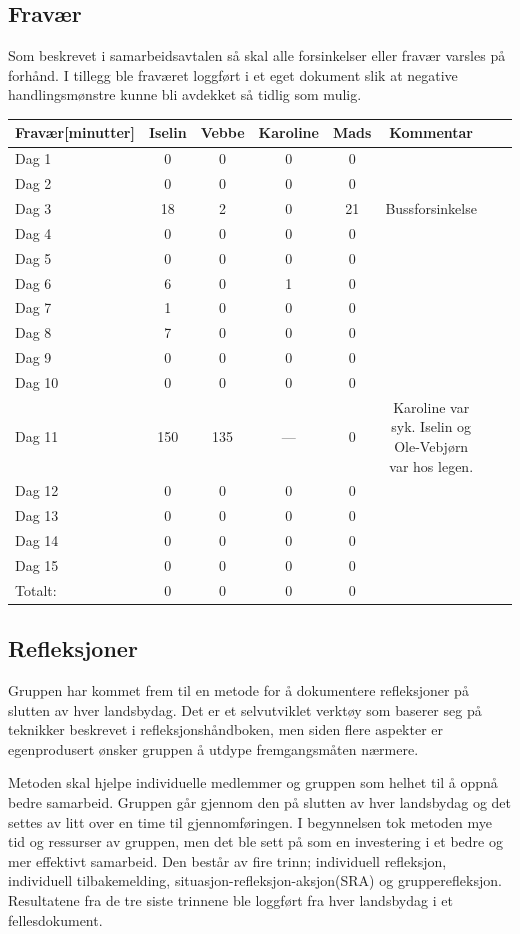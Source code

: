 \subsection{Fravær}
Som beskrevet i samarbeidsavtalen så skal alle forsinkelser eller fravær varsles på forhånd. I tillegg ble fraværet loggført i et eget dokument slik at negative handlingsmønstre kunne bli avdekket så tidlig som mulig.

\begin{tabular}{l*{6}{c}r}
Fravær[minutter] & Iselin & Vebbe & Karoline & Mads & Kommentar\\
\hline
Dag 1 & 0 & 0 & 0 & 0 \\
Dag 2 & 0 & 0 & 0 & 0 \\
Dag 3 & 18 & 2 & 0 & 21 & Bussforsinkelse\\
Dag 4 & 0 & 0 & 0 & 0 \\
Dag 5 & 0 & 0 & 0 & 0 \\
Dag 6 & 6 & 0 & 1 & 0 \\
Dag 7 & 1 & 0 & 0 & 0 \\
Dag 8 & 7 & 0 & 0 & 0 \\
Dag 9 & 0 & 0 & 0 & 0 \\
Dag 10 & 0 & 0 & 0 & 0 \\
Dag 11 & 150 & 135 & --- & 0 & \parbox[t]{5cm}{Karoline var syk. Iselin og Ole-Vebjørn var hos legen.}\\
Dag 12 & 0 & 0 & 0 & 0 \\
Dag 13 & 0 & 0 & 0 & 0 \\
Dag 14 & 0 & 0 & 0 & 0 \\
Dag 15 & 0 & 0 & 0 & 0 \\
\hline
Totalt: & 0 & 0 & 0 & 0 \\
\end{tabular}

\subsection{Refleksjoner} %
Gruppen har kommet frem til en metode for å dokumentere refleksjoner på slutten av hver landsbydag. Det er et selvutviklet verktøy som baserer seg på teknikker beskrevet i refleksjonshåndboken, men siden flere aspekter er egenprodusert ønsker gruppen å utdype fremgangsmåten nærmere.

Metoden skal hjelpe individuelle medlemmer og gruppen som helhet til å oppnå bedre samarbeid. Gruppen går gjennom den på slutten av hver landsbydag og det settes av litt over en time til gjennomføringen. I begynnelsen tok metoden mye tid og ressurser av gruppen, men det ble sett på som en investering i et bedre og mer effektivt samarbeid. Den består av fire trinn; individuell refleksjon, individuell tilbakemelding, situasjon-refleksjon-aksjon(SRA) og grupperefleksjon. Resultatene fra de tre siste trinnene ble loggført fra hver landsbydag i et fellesdokument.

